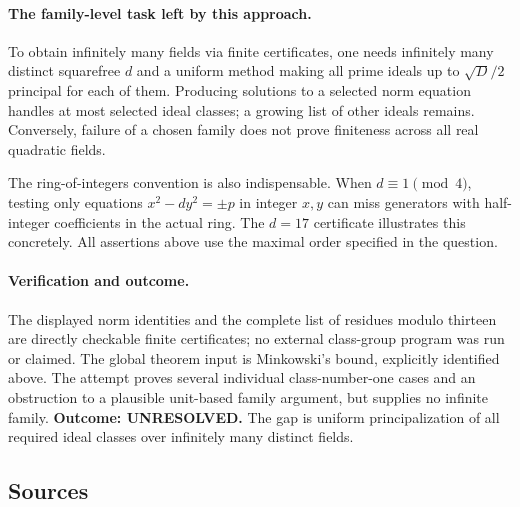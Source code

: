 \documentclass[11pt,a4paper]{article}
\begin{document}
\paragraph{The family-level task left by this approach.}
To obtain infinitely many fields via finite certificates, one needs
infinitely many distinct squarefree $d$ and a uniform method making all
prime ideals up to $\sqrt D/2$ principal for each of them. Producing
solutions to a selected norm equation handles at most selected ideal
classes; a growing list of other ideals remains. Conversely, failure
of a chosen family does not prove finiteness across all real quadratic
fields.

The ring-of-integers convention is also indispensable. When
$d\equiv1\pmod4$, testing only equations $x^2-dy^2=\pm p$ in
integer $x,y$ can miss generators with half-integer coefficients in the
actual ring. The $d=17$ certificate illustrates this concretely.
All assertions above use the maximal order specified in the question.

\paragraph{Verification and outcome.}
The displayed norm identities and the complete list of residues modulo
thirteen are directly checkable finite certificates; no external
class-group program was run or claimed. The global theorem input is
Minkowski's bound, explicitly identified above. The attempt proves
several individual class-number-one cases and an obstruction to a
plausible unit-based family argument, but supplies no infinite family.
\textbf{Outcome: UNRESOLVED.} The gap is uniform principalization of
all required ideal classes over infinitely many distinct fields.

\subsection{Sources}
\end{document}
